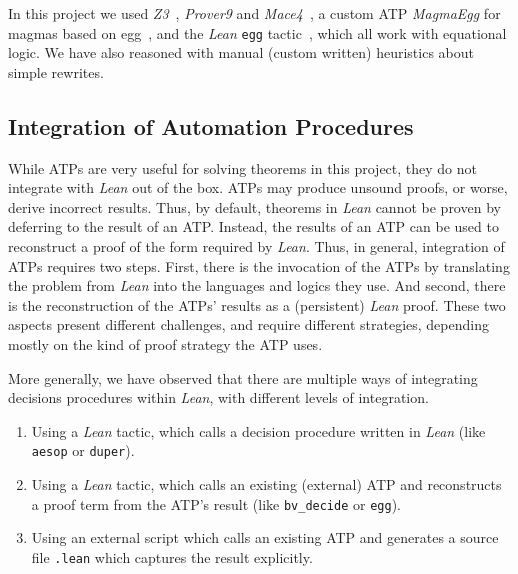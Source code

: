 In this project we used \emph{Z3}~\cite{DBLP:conf/tacas/MouraB08}, \emph{Prover9} and \emph{Mace4}~\cite{prover9-mace4}, a custom ATP \emph{MagmaEgg} for magmas based on egg~\cite{DBLP:journals/pacmpl/WillseyNWFTP21}, and the \emph{Lean} \texttt{egg} tactic~\cite{DBLP:journals/pacmpl/KoehlerGBGTS24,rossel2024equality}, which all work with equational logic. We have also reasoned with manual (custom written) heuristics about simple rewrites.

\subsection{Integration of Automation Procedures}
\label{sec:proof-reconstruction}

While ATPs are very useful for solving theorems in this project, they do not integrate with \emph{Lean} out of the box.
ATPs may produce unsound proofs, or worse, derive incorrect results.
Thus, by default, theorems in \emph{Lean} cannot be proven by deferring to the result of an ATP.
Instead, the results of an ATP can be used to reconstruct a proof of the form required by \emph{Lean}.
Thus, in general, integration of ATPs requires two steps.
First, there is the invocation of the ATPs by translating the problem from \emph{Lean} into the languages and logics they use. 
And second, there is the reconstruction of the ATPs' results as a (persistent) \emph{Lean} proof.
These two aspects present different challenges, and require different strategies, depending mostly on the kind of proof strategy the ATP uses.

More generally, we have observed that there are multiple ways of integrating decisions procedures within \emph{Lean}, with different levels of integration.

\begin{enumerate}
    \item Using a \emph{Lean} tactic, which calls a decision procedure written in \emph{Lean} (like \texttt{aesop} or \texttt{duper}).
    \item\label{inter} Using a \emph{Lean} tactic, which calls an existing (external) ATP and reconstructs a proof term from the ATP's result (like \texttt{bv\_decide} or \texttt{egg}).
    \item\label{external} Using an external script which calls an existing ATP and generates a source file \texttt{.lean} which captures the result explicitly.
\end{enumerate}

